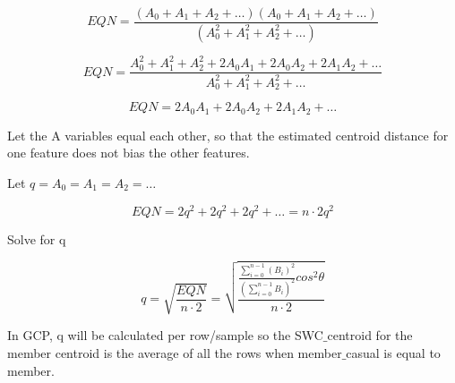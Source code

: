 \documentclass[11pt, onecolumn]{article}
\begin{document}
\begin{equation}
EQN  =   \frac{(A_0 + A_1 + A_2 + \ldots)(A_0 + A_1 + A_2 + \ldots) }{(A_{0}^{2} + A_{1}^{2} + A_{2}^{2} + \ldots)} 
\end{equation}

\begin{equation}
EQN  =   \frac{A_{0}^{2} + A_{1}^{2} + A_{2}^{2} + 2A_{0}A_{1} + 2A_{0}A_{2} + 2A_{1}A_{2} + \ldots }{A_{0}^{2} + A_{1}^{2} + A_{2}^{2} + \ldots} 
\end{equation}

\begin{equation}
EQN  =  2A_{0}A_{1} + 2A_{0}A_{2} + 2A_{1}A_{2} + \ldots
\end{equation}

Let the A variables equal each other, so that the estimated centroid distance for one feature does not bias the other features. 

Let $q = A_0 = A_1 = A_2 = \ldots $ 

\begin{equation}
EQN  =  2q^{2} + 2q^{2} + 2q^{2} + \ldots = n \cdot 2q^{2}
\end{equation}

Solve for q

\begin{equation}
q  =  \sqrt{ \frac{ EQN }{ n \cdot 2 }} = \sqrt{ \frac{ \frac{ \sum^{n-1}_{i=0} (B_i)^{2}} { (\sum^{n-1}_{i=0} B_i)^{2} } cos^{2} \theta }{ n \cdot 2 }}
\end{equation}

In GCP, q will be calculated per row/sample so the SWC$\_$centroid for the member centroid is the average of all the rows when member$\_$casual is equal to member.
\end{document}
